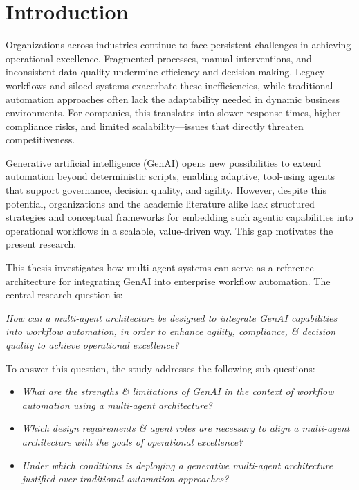 \section{Introduction}\label{sec:intro}
Organizations across industries continue to face persistent challenges in achieving operational excellence. Fragmented processes, manual interventions, and inconsistent data quality undermine efficiency and decision-making. Legacy workflows and siloed systems exacerbate these inefficiencies, while traditional automation approaches often lack the adaptability needed in dynamic business environments. For companies, this translates into slower response times, higher compliance risks, and limited scalability—issues that directly threaten competitiveness.

Generative artificial intelligence (GenAI) opens new possibilities to extend automation beyond deterministic scripts, enabling adaptive, tool-using agents that support governance, decision quality, and agility. However, despite this potential, organizations and the academic literature alike lack structured strategies and conceptual frameworks for embedding such agentic capabilities into operational workflows in a scalable, value-driven way. This gap motivates the present research.

This thesis investigates how multi-agent systems can serve as a reference architecture for integrating GenAI into enterprise workflow automation. The central research question is:

\vspace{0.5\baselineskip}
\emph{How can a multi-agent architecture be designed to integrate GenAI capabilities into workflow automation, in order to enhance agility, compliance, \& decision quality to achieve operational excellence?}
\vspace{0.5\baselineskip}

To answer this question, the study addresses the following sub-questions:
\begin{itemize}
    \item \emph{What are the strengths \& limitations of GenAI in the context of workflow automation using a multi-agent architecture?}
    \item \emph{Which design requirements \& agent roles are necessary to align a multi-agent architecture with the goals of operational excellence?}
    \item \emph{Under which conditions is deploying a generative multi-agent architecture justified over traditional automation approaches?}
\end{itemize}

